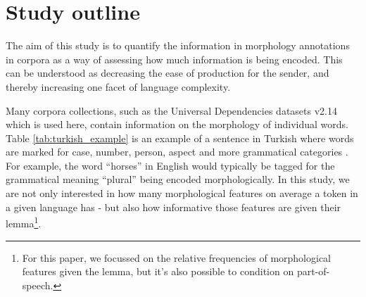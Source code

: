 \documentclass[a4paper]{article}
\begin{document}


\FloatBarrier
\section{Study outline}
The aim of this study is to quantify the information in morphology annotations in corpora as a way of assessing how much information is being encoded. This can be understood as decreasing the ease of production for the sender, and thereby increasing one facet of language complexity.

Many corpora collections, such as the Universal Dependencies datasets v2.14 \citep{UD_2.14} which is used here, contain information on the morphology of individual words. Table \ref{tab:turkish_example} is an example of a sentence in Turkish where words are marked for case, number, person, aspect and more grammatical categories \citep{kuzgun_2020_UD_turkish_penn}.
For example, the word ``horses'' in English would typically be tagged for the grammatical meaning ``plural'' being encoded morphologically.
In this study, we are not only interested in how many morphological features on average a token in a given language has - but also how informative those features are given their lemma\footnote{For this paper, we focussed on the relative frequencies of morphological features given the lemma, but it's also possible to condition on part-of-speech.}. 
\end{document}
